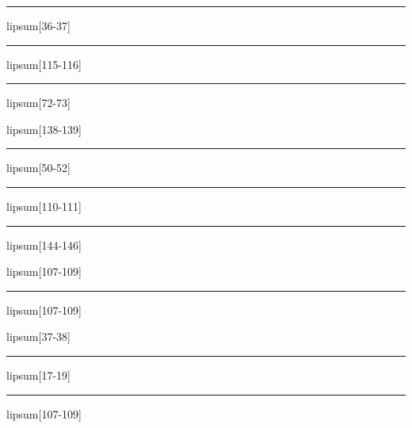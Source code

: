 \documentclass[11pt,a4paper]{article}
\begin{document}
\begin{simplewrap}
  \textcolor{blue!31}{\rule{5.1cm}{7.9cm}}
\end{simplewrap}
lipsum[36-37]

\begin{simplewrap}
  \textcolor{orange!29}{\rule{3.1cm}{6.9cm}}
\end{simplewrap}
lipsum[115-116]

\begin{simplewrap}
  \textcolor{brown!13}{\rule{4.8cm}{3.6cm}}
\end{simplewrap}
lipsum[72-73]

lipsum[138-139]

\begin{simplewrap}
  \textcolor{blue!53}{\rule{5.0cm}{2.7cm}}
\end{simplewrap}
lipsum[50-52]

\begin{simplewrap}
  \textcolor{cyan!13}{\rule{5.7cm}{4.9cm}}
\end{simplewrap}
lipsum[110-111]

\begin{simplewrap}
  \textcolor{lime!10}{\rule{3.9cm}{4.8cm}}
\end{simplewrap}
lipsum[144-146]

lipsum[107-109]

\begin{simplewrap}
  \textcolor{blue!28}{\rule{3.5cm}{7.8cm}}
\end{simplewrap}
lipsum[107-109]

lipsum[37-38]

\begin{simplewrap}
  \textcolor{yellow!29}{\rule{4.4cm}{8.9cm}}
\end{simplewrap}
lipsum[17-19]

\begin{simplewrap}
  \textcolor{pink!15}{\rule{3.0cm}{7.1cm}}
\end{simplewrap}
lipsum[107-109]
\end{document}
